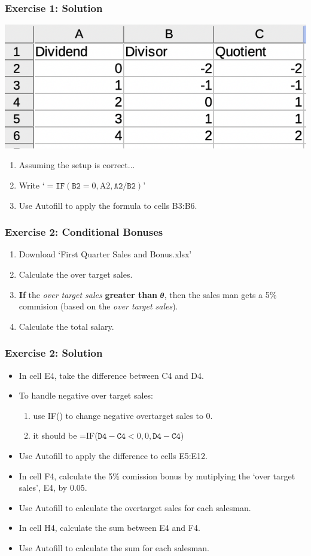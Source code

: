\documentclass[12pt]{beamer}
\begin{document}
	\begin{frame}
		\frametitle{Exercise 1: Solution}
		\begin{center}
			\includegraphics[width= 0.6 \textwidth]{Exercise1Soln.png}
		\end{center}
		\begin{enumerate}
			\item Assuming the setup is correct...
			\item Write `$= \texttt{IF}(\texttt{B2}=0, \text{A2}, \texttt{A2/B2})$'
			\item Use Autofill to apply the formula to cells B3:B6. 
			 
		\end{enumerate}
	\end{frame}
	\begin{frame}
		\frametitle{Exercise 2: Conditional Bonuses}
		\begin{enumerate}
			\item Download `First Quarter Sales and Bonus.xlsx'
			\item Calculate the over target sales.
			\item \textbf{If} the\textit{ over target sales} \textbf{greater than} \textit{\texttt{0}}, then the sales man gets a 5\% commision (based on the \textit{over target sales}). 
			\item Calculate the total salary.   
		\end{enumerate}
	\end{frame}
	\begin{frame}
		\frametitle{Exercise 2: Solution}
		\begin{itemize}
			\item In cell E4, take the difference between C4 and D4.
			\item To handle negative over target sales:\begin{enumerate}
				\item use IF() to change negative overtarget sales to 0. 
				\item it should be =IF($\texttt{D4}-\texttt{C4}< 0, 0, \texttt{D4} -\texttt{C4}$)
				\end{enumerate}
			\item Use Autofill to apply the difference to cells E5:E12. 
			\item In cell F4, calculate the 5\% comission bonus by mutiplying the `over target sales', E4, by 0.05. 
			\item Use Autofill to calculate the overtarget sales for each salesman. 
			\item In cell H4, calculate the sum between E4 and F4.
			\item Use Autofill to calculate the sum for each salesman. 
		\end{itemize}
	\end{frame}
\end{document}
